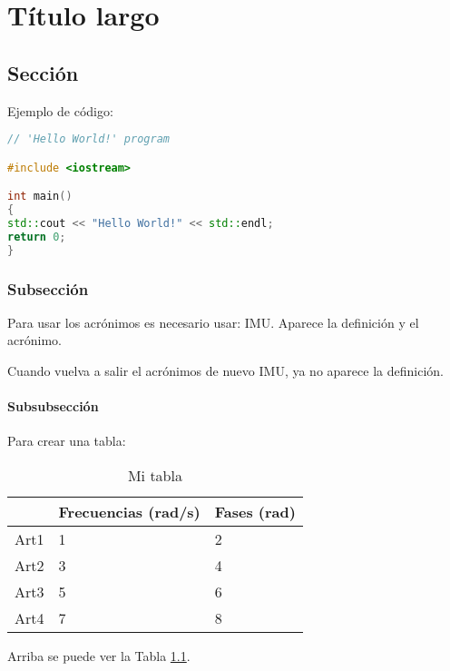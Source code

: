 \chapter[Título corto]{Título largo} \label{cap2}

\newpage

	
\section{Sección}
	
	\blindtext
	
	Ejemplo de código:
	
\begin{lstlisting}[caption = Esto es código,language=C++]
// 'Hello World!' program 

#include <iostream>

int main()
{
std::cout << "Hello World!" << std::endl;
return 0;
}
\end{lstlisting}

	\subsection{Subsección}
	
		\blindtext
		
		Para usar los acrónimos es necesario usar: \ac{IMU}. Aparece la definición y el acrónimo.
		
		Cuando vuelva a salir el acrónimos de nuevo \ac{IMU}, ya no aparece la definición.
		
		\subsubsection{Subsubsección}
			\blindtext
			
			\blindtext
			
			Para crear una tabla:
			
			\begin{table}[htb]
				\begin{center}
					\begin{tabular}{|l||l|l|}
						\hline
						&    Frecuencias (rad/s)  & Fases (rad) \\
						\hline \hline
						Art1   &    1 &  2 \\ \hline
						Art2   &    3 &  4 \\ \hline
						Art3   &    5 &  6 \\ \hline
						Art4   &    7 &  8 \\ \hline					
					\end{tabular}
					\caption{Mi tabla}
					\label{tabla:Tabla_1}
				\end{center}
				
				Arriba se puede ver la Tabla \ref{tabla:Tabla_1}.
			\end{table}